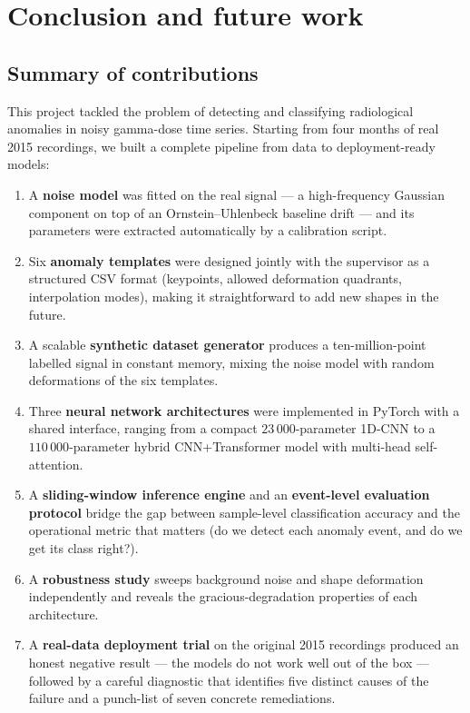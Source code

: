 \chapter{Conclusion and future work}
\label{chap:conclusion}

\section{Summary of contributions}
\label{sec:conc-summary}

This project tackled the problem of detecting and classifying
radiological anomalies in noisy gamma-dose time series. Starting from
four months of real 2015 recordings, we built a complete pipeline from
data to deployment-ready models:

\begin{enumerate}[leftmargin=*, itemsep=0.25em]
    \item A \textbf{noise model} was fitted on the real signal --- a
    high-frequency Gaussian component on top of an Ornstein--Uhlenbeck
    baseline drift --- and its parameters were extracted automatically
    by a calibration script.
    \item Six \textbf{anomaly templates} were designed jointly with the
    supervisor as a structured CSV format (keypoints, allowed
    deformation quadrants, interpolation modes), making it
    straightforward to add new shapes in the future.
    \item A scalable \textbf{synthetic dataset generator} produces a
    ten-million-point labelled signal in constant memory, mixing the
    noise model with random deformations of the six templates.
    \item Three \textbf{neural network architectures} were implemented
    in PyTorch with a shared interface, ranging from a compact
    $23\,000$-parameter 1D-CNN to a $110\,000$-parameter hybrid
    CNN+Transformer model with multi-head self-attention.
    \item A \textbf{sliding-window inference engine} and an
    \textbf{event-level evaluation protocol} bridge the gap between
    sample-level classification accuracy and the operational metric
    that matters (do we detect each anomaly event, and do we get its
    class right?).
    \item A \textbf{robustness study} sweeps background noise and shape
    deformation independently and reveals the gracious-degradation
    properties of each architecture.
    \item A \textbf{real-data deployment trial} on the original 2015
    recordings produced an honest negative result --- the models do
    not work well out of the box --- followed by a careful diagnostic
    that identifies five distinct causes of the failure and a punch-list
    of seven concrete remediations.
\end{enumerate}

